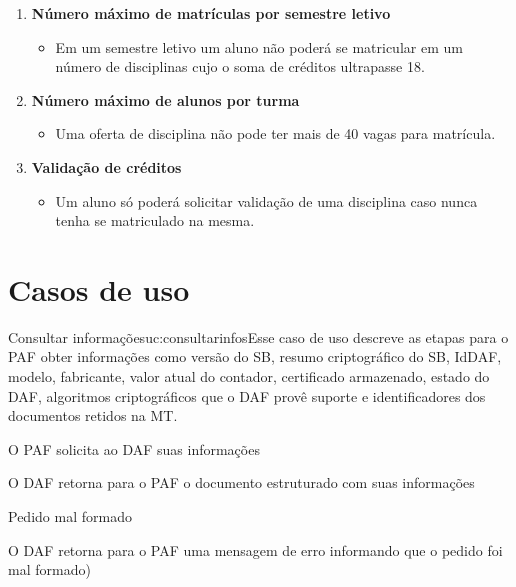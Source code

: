 \documentclass[11pt]{classes/ifscarticle}
\begin{document}
\begin{enumerate}
    \item \textbf{Número máximo de matrículas por semestre letivo}
    \begin{itemize}
        \item Em um semestre letivo um aluno não poderá se matricular em um número de disciplinas cujo o soma de créditos ultrapasse 18.
    \end{itemize}
    \item \textbf{Número máximo de alunos por turma}
    \begin{itemize}
        \item Uma oferta de disciplina não pode ter mais de 40 vagas para matrícula.
    \end{itemize}
    \item \textbf{Validação de créditos}
    \begin{itemize}
        \item Um aluno só poderá solicitar validação de uma disciplina caso nunca tenha se matriculado na mesma.
    \end{itemize}
\end{enumerate}


\section{Casos de uso}\label{sec:casos_de_uso}


\begin{usecase}{Consultar informações}{uc:consultarinfos}{Esse caso de uso descreve as etapas para o PAF obter informações como versão do SB, resumo criptográfico do SB, IdDAF, modelo, fabricante, valor atual do contador, certificado armazenado, estado do DAF, algoritmos criptográficos que o DAF provê suporte e identificadores dos documentos retidos na MT.}
    \begin{cabecalhoUC}
    \end{cabecalhoUC}

    \begin{fluxoprincipal}
        \item O PAF solicita ao DAF suas informações 
        \item O DAF retorna para o PAF o documento estruturado com suas informações
    \end{fluxoprincipal}  

    \begin{fluxoexcecao}{Pedido mal formado}
        \item O DAF retorna para o PAF uma mensagem de erro informando que o pedido foi mal formado)
    \end{fluxoexcecao}   
\end{usecase}



\end{document}
